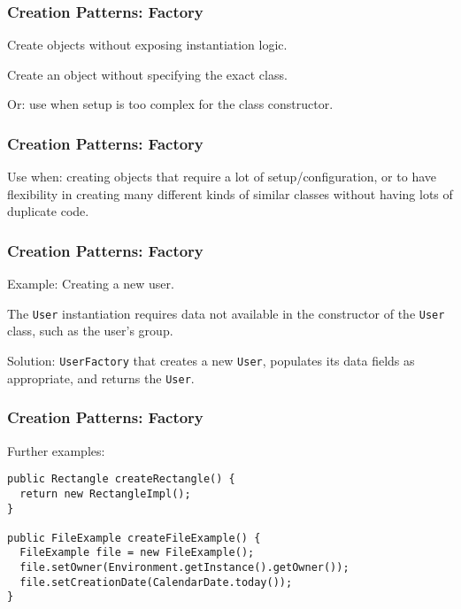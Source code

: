 \begin{frame}
\frametitle{Creation Patterns: Factory}

\begin{changemargin}{1cm}
Create objects without exposing instantiation logic.

Create an object without specifying the exact class.

Or: use when setup is too complex for the class constructor.

\end{changemargin}
\end{frame}

\begin{frame}
\frametitle{Creation Patterns: Factory}

\begin{changemargin}{1cm}

Use when: creating objects that require a lot of setup/configuration, or to have flexibility in creating many different kinds of similar classes without having lots of duplicate code.

\end{changemargin}
\end{frame}

\begin{frame}
\frametitle{Creation Patterns: Factory}

\begin{changemargin}{1cm}
Example: Creating a new user. 

The \texttt{User} instantiation requires data not available in the constructor of the \texttt{User} class, such as the user's group.

Solution: \texttt{UserFactory} that creates a new \texttt{User}, populates its data fields as appropriate, and returns the \texttt{User}.

\end{changemargin}
\end{frame}

\begin{frame}[fragile]
\frametitle{Creation Patterns: Factory}
\begin{changemargin}{1cm}
Further examples:

\begin{verbatim}
public Rectangle createRectangle() {
  return new RectangleImpl();
}

public FileExample createFileExample() {
  FileExample file = new FileExample();
  file.setOwner(Environment.getInstance().getOwner());
  file.setCreationDate(CalendarDate.today());
}

\end{verbatim}
\end{changemargin}
\end{frame}


